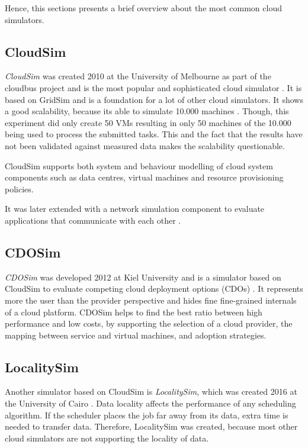 Hence, this sections presents a brief overview about the most common cloud simulators.

\subsection{CloudSim}
\textit{CloudSim} was created 2010 at the University of Melbourne as part of the cloudbus project and is the most popular and sophisticated cloud simulator \cite{compare_grid_cloud}. It is based on GridSim and is a foundation for a lot of other cloud simulators.
It shows a good scalability, because its able to simulate 10.000 machines \cite{cloud_sim}. Though, this experiment did only create 50 VMs resulting in only 50 machines of the 10.000 being used to process the submitted tasks. 
This and the fact that the results have not been validated against measured data makes the scalability questionable.

CloudSim supports both system and behaviour modelling of cloud system components such as data centres, virtual machines and resource provisioning policies.

It was later extended with a network simulation component to evaluate applications that communicate with each other \cite{networkcloudsim}.

\subsection{CDOSim}
\textit{CDOSim} was developed 2012 at Kiel University and is a simulator based on CloudSim to evaluate competing cloud deployment options (CDOs) \cite{cdosim}. It represents more the user than the provider perspective and hides fine fine-grained internals of a cloud platform. CDOSim helps to find the best ratio between high performance and low costs, by supporting the selection of a cloud provider, the mapping between service and virtual machines, and adoption strategies. 

\subsection{LocalitySim}
Another simulator based on CloudSim is \textit{LocalitySim}, which was created 2016 at the University of Cairo \cite{localitysim}. Data locality affects the performance of any scheduling algorithm. If the scheduler places the job far away from its data, extra time is needed to transfer data. Therefore, LocalitySim was created, because most other cloud simulators are not supporting the locality of data.

